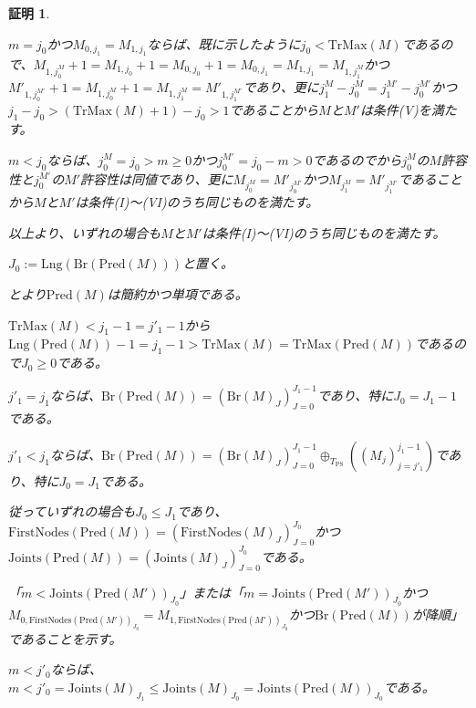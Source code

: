 \documentclass[dvipdfmx,uplatex]{jsarticle}
\theoremstyle{customnonumberbreakfortheorem}
\theoremstyle{customnonumberbreakforproof}
\newtheorem{hideableproof}{証明}
\begin{document}
\begin{hideableproof}
\begin{indented}
\begin{indented}
			\item \(m = j_0\)かつ\(M_{0,j_1} = M_{1,j_1}\)ならば、既に示したように\(j_0 < \textrm{TrMax}(M)\)であるので、\(M_{1,j_0^M}+1 = M_{1,j_0}+1 = M_{0,j_0}+1 = M_{0,j_1} = M_{1,j_1} = M_{1,j_1^M}\)かつ\(M'_{1,j_0^{M'}}+1 = M_{1,j_0^M}+1 = M_{1,j_1^M} = M'_{1,j_1^{M'}}\)であり、更に\(j_1^M-j_0^M = j_1^{M'}-j_0^{M'}\)かつ\(j_1-j_0 > (\textrm{TrMax}(M)+1) - j_0 > 1\)であることから\(M\)と\(M'\)は条件(V)を満たす。
			\item \(m < j_0\)ならば、\(j_0^M = j_0 > m \geq 0\)かつ\(j_0^{M'} = j_0-m > 0\)であるのでから\(j_0^M\)の\(M\)許容性と\(j_0^{M'}\)の\(M'\)許容性は同値であり、更に\(M_{j_0^M} = M'_{j_0^{M'}}\)かつ\(M_{j_1^M} = M'_{j_1^{M'}}\)であることから\(M\)と\(M'\)は条件(I)～(VI)のうち同じものを満たす。
			\item 以上より、いずれの場合も\(M\)と\(M'\)は条件(I)～(VI)のうち同じものを満たす。
			\item
			\item \(J_0 := \textrm{Lng}(\textrm{Br}(\textrm{Pred}(M)))\)と置く。
			\item {}とより\(\textrm{Pred}(M)\)は簡約かつ単項である。
			\item \(\textrm{TrMax}(M) < j_1-1 = j'_1-1\)から\(\textrm{Lng}(\textrm{Pred}(M))-1 = j_1-1 > \textrm{TrMax}(M) = \textrm{TrMax}(\textrm{Pred}(M))\)であるので\(J_0 \geq 0\)である。
			\item \(j'_1 = j_1\)ならば、\(\textrm{Br}(\textrm{Pred}(M)) = (\textrm{Br}(M)_J)_{J=0}^{J_1-1}\)であり、特に\(J_0 = J_1-1\)である。
			\item \(j'_1 < j_1\)ならば、\(\textrm{Br}(\textrm{Pred}(M)) = (\textrm{Br}(M)_J)_{J=0}^{J_1-1} \oplus_{T_{\textrm{PS}}} ((M_j)_{j=j'_1}^{j_1-1})\)であり、特に\(J_0 = J_1\)である。
			\item 従っていずれの場合も\(J_0 \leq J_1\)であり、\(\textrm{FirstNodes}(\textrm{Pred}(M)) = (\textrm{FirstNodes}(M)_J)_{J=0}^{J_0}\)かつ\(\textrm{Joints}(\textrm{Pred}(M)) = (\textrm{Joints}(M)_J)_{J=0}^{J_0}\)である。
			\item 「\(m < \textrm{Joints}(\textrm{Pred}(M'))_{J_0}\)」または「\(m = \textrm{Joints}(\textrm{Pred}(M'))_{J_0}\)かつ\(M_{0,\textrm{FirstNodes}(\textrm{Pred}(M'))_{J_0}} = M_{1,\textrm{FirstNodes}(\textrm{Pred}(M'))_{J_0}}\)かつ\(\textrm{Br}(\textrm{Pred}(M))\)が降順」であることを示す。
			\item \(m < j'_0\)ならば、\(m < j'_0 = \textrm{Joints}(M)_{J_1} \leq \textrm{Joints}(M)_{J_0} = \textrm{Joints}(\textrm{Pred}(M))_{J_0}\)である。

\end{indented}
\end{indented}
\end{hideableproof}
\end{document}
